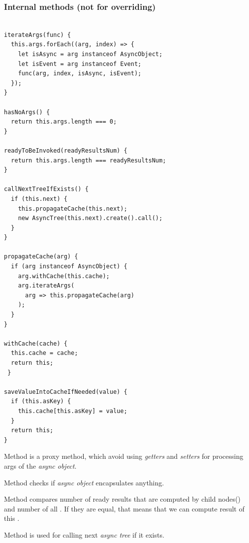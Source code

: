 \documentclass{article}
\newcommand{\cit}[1]{{\fontfamily{qcr}\selectfont{\textit{\textcolor{superdarkgray}{#1}}}}}
\begin{document}
\vspace*{10px}

\subsubsection{Internal methods (not for overriding)}

\begin{lstlisting}

iterateArgs(func) {
  this.args.forEach((arg, index) => {
    let isAsync = arg instanceof AsyncObject;
    let isEvent = arg instanceof Event;
    func(arg, index, isAsync, isEvent);
  });
}

hasNoArgs() {
  return this.args.length === 0;
}

readyToBeInvoked(readyResultsNum) {
  return this.args.length === readyResultsNum;
}

callNextTreeIfExists() {
  if (this.next) {
    this.propagateCache(this.next);
    new AsyncTree(this.next).create().call();
  }
}

propagateCache(arg) {
  if (arg instanceof AsyncObject) {
    arg.withCache(this.cache);
    arg.iterateArgs(
      arg => this.propagateCache(arg)
    );
  }
}

withCache(cache) {
  this.cache = cache;
  return this;
 }
 
saveValueIntoCacheIfNeeded(value) {
  if (this.asKey) {
    this.cache[this.asKey] = value;
  }
  return this;
}

\end{lstlisting}

Method \cit{iterateArgs} is a proxy method, which avoid using \textit{getters} and \textit{setters} for processing args of the \textit{async object}.

Method \cit{hasNoArgs} checks if \textit{async object} encapsulates anything.

Method \cit{readyToBeInvoked} compares number of ready results that are computed by child nodes(\cit{...args}) and number of all \cit{..args}. If they are equal, that means that we can compute result of this \cit{async object}.

Method \cit{callNextTreeIfExists} is used for calling next \textit{async tree} if it exists.
\end{document}
